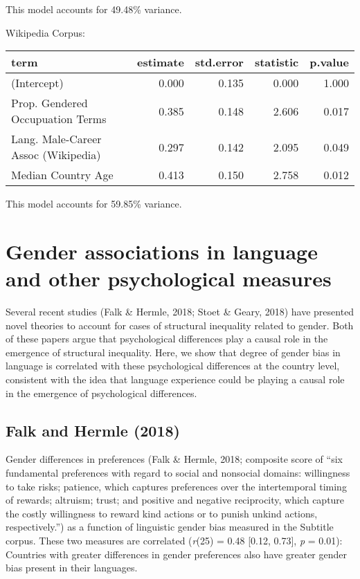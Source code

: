 \documentclass[]{article}
\begin{document}
This model accounts for 49.48\% variance.

Wikipedia Corpus:

\begin{table}[H]
\centering\begingroup\fontsize{9}{11}\selectfont

\begin{tabular}{l|r|r|r|r}
\hline
term & estimate & std.error & statistic & p.value\\
\hline
(Intercept) & 0.000 & 0.135 & 0.000 & 1.000\\
\hline
Prop. Gendered Occupuation Terms & 0.385 & 0.148 & 2.606 & 0.017\\
\hline
Lang. Male-Career Assoc (Wikipedia) & 0.297 & 0.142 & 2.095 & 0.049\\
\hline
Median Country Age & 0.413 & 0.150 & 2.758 & 0.012\\
\hline
\end{tabular}
\endgroup{}
\end{table}

This model accounts for 59.85\% variance.

\hypertarget{gender-associations-in-language-and-other-psychological-measures}{%
\section{Gender associations in language and other psychological
measures}\label{gender-associations-in-language-and-other-psychological-measures}}

Several recent studies (Falk \& Hermle, 2018; Stoet \& Geary, 2018) have
presented novel theories to account for cases of structural inequality
related to gender. Both of these papers argue that psychological
differences play a causal role in the emergence of structural
inequality. Here, we show that degree of gender bias in language is
correlated with these psychological differences at the country level,
consistent with the idea that language experience could be playing a
causal role in the emergence of psychological differences.

\hypertarget{falk-and-hermle-2018}{%
\subsection{Falk and Hermle (2018)}\label{falk-and-hermle-2018}}

Gender differences in preferences (Falk \& Hermle, 2018; composite score
of ``six fundamental preferences with regard to social and nonsocial
domains: willingness to take risks; patience, which captures preferences
over the intertemporal timing of rewards; altruism; trust; and positive
and negative reciprocity, which capture the costly willingness to reward
kind actions or to punish unkind actions, respectively.'') as a function
of linguistic gender bias measured in the Subtitle corpus. These two
measures are correlated (\emph{r}(25) = 0.48 {[}0.12, 0.73{]}, \emph{p}
= 0.01): Countries with greater differences in gender preferences also
have greater gender bias present in their languages.
\end{document}
